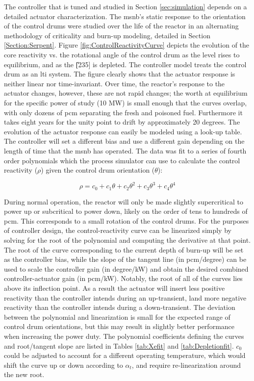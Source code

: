 The controller that is tuned and studied in Section \ref{sec:simulation} depends on a detailed actuator characterization. The \acs{msnb}'s static response to the orientation of the control drums were studied over the life of the reactor in an alternating methodology of criticality and burn-up modeling, detailed in Section \ref{Section:Serpent}. Figure \ref{fig:ControlReactivityCurve} depicts the evolution of the core reactivity vs. the rotational angle of the control drum as the \Xe level rises to equilibrium, and as the \U[235] is depleted. The controller model treats the control drum as an \acs{lti} system. The figure clearly shows that the actuator response is neither linear nor time-invariant. Over time, the reactor's response to the actuator changes, however, these are not rapid changes; the \Xe worth at equilibrium for the specific power of study (10 MW) is small enough that the curves overlap, with only dozens of pcm separating the fresh and poisoned fuel. Furthermore it takes eight years for the unity point to drift by approximately 20 degrees. The evolution of the actuator response can easily be modeled using a look-up table. The controller will set a different bias and use a different gain depending on the length of time that the \acs{msnb} has operated. The data was fit to a series of fourth order polynomials which the process simulator can use to calculate the control reactivity ($\rho$) given the control drum orientation ($\theta$):

\begin{equation}
    \rho = c_0 + c_1\theta + c_2\theta^2 + c_3\theta^3 + c_4\theta^4
\end{equation}

During normal operation, the reactor will only be made slightly supercritical to power up or subcritical to power down, likely on the order of tens to hundreds of pcm. This corresponds to a small rotation of the control drums. For the purposes of controller design, the control-reactivity curve can be linearized simply by solving for the root of the polynomial and computing the derivative at that point. The root of the curve corresponding to the current depth of burn-up will be set as the controller bias, while the slope of the tangent line (in pcm/degree) can be used to scale the controller gain (in degree/kW) and obtain the desired combined controller-actuator gain (in pcm/kW). Notably, the root of all of the curves lies above its inflection point. As a result the actuator will insert less positive reactivity than the controller intends during an up-transient, land more negative reactivity than the controller intends during a down-transient. The deviation between the polynomial and linearization is small for the expected range of control drum orientations, but this may result in slightly better performance when increasing the power duty. The polynomial coefficients defining the curves and root/tangent slope are listed in Tables \ref{tab:Xefit} and \ref{tab:Depletionfit}. $c_0$ could be adjusted to account for a different operating temperature, which would shift the curve up or down according to $\alpha_t$, and require re-linearization around the new root. 

